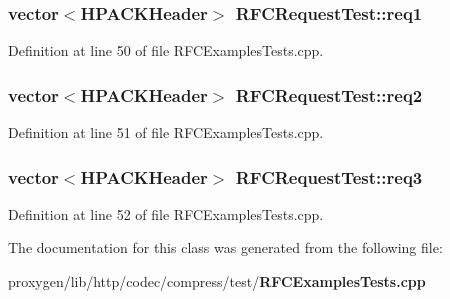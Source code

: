 \subsubsection[{req1}]{\setlength{\rightskip}{0pt plus 5cm}vector$<${\bf H\+P\+A\+C\+K\+Header}$>$ R\+F\+C\+Request\+Test\+::req1\hspace{0.3cm}{\ttfamily [protected]}}\label{classRFCRequestTest_ad2263137f6130a73eeac808a0d8ff9ca}


Definition at line 50 of file R\+F\+C\+Examples\+Tests.\+cpp.

\subsubsection[{req2}]{\setlength{\rightskip}{0pt plus 5cm}vector$<${\bf H\+P\+A\+C\+K\+Header}$>$ R\+F\+C\+Request\+Test\+::req2\hspace{0.3cm}{\ttfamily [protected]}}\label{classRFCRequestTest_a8c664beed3ddfb15addafbdc6d153caf}


Definition at line 51 of file R\+F\+C\+Examples\+Tests.\+cpp.

\subsubsection[{req3}]{\setlength{\rightskip}{0pt plus 5cm}vector$<${\bf H\+P\+A\+C\+K\+Header}$>$ R\+F\+C\+Request\+Test\+::req3\hspace{0.3cm}{\ttfamily [protected]}}\label{classRFCRequestTest_a67228faaa78ffd15c530ac7db3f3943e}


Definition at line 52 of file R\+F\+C\+Examples\+Tests.\+cpp.



The documentation for this class was generated from the following file\+:\begin{DoxyCompactItemize}
\item 
proxygen/lib/http/codec/compress/test/{\bf R\+F\+C\+Examples\+Tests.\+cpp}\end{DoxyCompactItemize}
